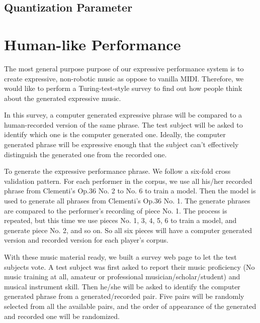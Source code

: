 \subsection{Quantization Parameter}

\section{Human-like Performance}
The most general purpose purpose of our expressive performance system is to create expressive, non-robotic music as oppose to vanilla MIDI. Therefore, we would like to perform a Turing-test-style survey to find out how people think about the generated expressive music.

In this survey, a computer generated expressive phrase will be compared to a human-recorded version of the same phrase. The test subject will be asked to identify which one is the computer generated one. Ideally, the computer generated phrase will be expressive enough that the subject can't effectively distinguish the generated one from the recorded one.

To generate the expressive performance phrase. We follow a six-fold cross validation pattern. For each performer in the corpus, we use all his/her recorded phrase from Clementi's Op.36 No. 2 to No. 6 to train a model. Then the model is used to generate all phrases from Clementi's Op.36 No. 1. The generate phrases are compared to the performer's recording of piece No. 1.  The process is repeated, but this time we use pieces No. 1, 3, 4, 5, 6 to train a model, and generate piece No. 2, and so on. So all six pieces will have a computer generated version and recorded version for each player's corpus.

With these music material ready, we built a survey web page to let the test subjects vote. A test subject was first asked to report their music proficiency (No music training at all, amateur or professional musician/scholar/student) and musical instrument skill. Then he/she will be asked to identify the computer generated phrase from a generated/recorded pair. Five pairs will be randomly selected from all the available pairs, and the order of appearance of the generated and recorded one will be randomized.


